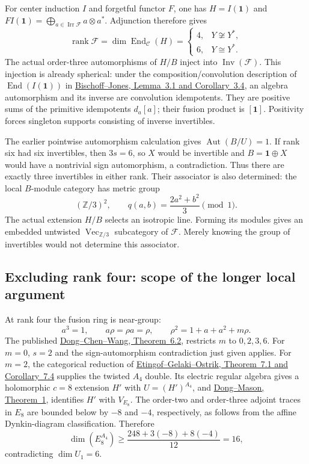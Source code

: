 For center induction $I$ and forgetful functor $F$, one has $H=I(\mathbf1)$
and $FI(\mathbf1)=\bigoplus_{a\in\operatorname{Irr}\mathcal F}a\otimes a^*$.
Adjunction therefore gives
\begin{equation}
 \operatorname{rank}\mathcal F
 =\dim\operatorname{End}_{\mathcal C}(H)
 =\begin{cases}4,&Y\not\cong Y^*,\\6,&Y\cong Y^*.
 \end{cases}
 \label{eq:rank-fork}
\end{equation}
The actual order-three automorphisms of $H/B$ inject into
$\operatorname{Inv}(\mathcal F)$. This injection is already spherical:
under the composition/convolution description of
$\operatorname{End}(I(\mathbf1))$ in
\href{https://arxiv.org/html/1909.02816}{Bischoff--Jones,
Lemma~3.1 and Corollary~3.4}, an algebra automorphism and its inverse
are convolution idempotents. They are positive sums of the primitive
idempotents $d_a[a]$; their fusion product is $[\mathbf1]$. Positivity
forces singleton supports consisting of inverse invertibles.

The earlier pointwise automorphism calculation gives
$\operatorname{Aut}(B/U)=1$. If rank six had six invertibles, then
$3s=6$, so $X$ would be invertible and $B=\mathbf1\oplus X$ would
have a nontrivial sign automorphism, a contradiction. Thus there are
exactly three invertibles in either rank. Their associator is also
determined: the local $B$-module category has metric group
\[
 (\mathbb Z/3)^2,\qquad q(a,b)=\frac{2a^2+b^2}{3}\pmod1.
\]
The actual extension $H/B$ selects an isotropic line. Forming its
modules gives an embedded untwisted $\operatorname{Vec}_{\mathbb Z/3}$
subcategory of $\mathcal F$. Merely knowing the group of invertibles
would not determine this associator.

\subsection{Excluding rank four: scope of the longer local argument}

At rank four the fusion ring is near-group:
\[
 a^3=1,\qquad a\rho=\rho a=\rho,\qquad
 \rho^2=1+a+a^2+m\rho.
\]
The published \href{https://doi.org/10.1016/j.jalgebra.2022.02.020}
{Dong--Chen--Wang, Theorem~6.2}, restricts $m$ to $0,2,3,6$.
For $m=0$, $s=2$ and the sign-automorphism contradiction just given
applies. For $m=2$, the categorical reduction of
\href{https://arxiv.org/html/math/0304194#S7}{Etingof--Gelaki--Ostrik,
Theorem~7.1 and Corollary~7.4} supplies the twisted $A_4$ double.
Its electric regular algebra gives a holomorphic $c=8$ extension
$H'$ with $U=(H')^{A_4}$, and
\href{https://msp.org/pjm/2004/213-2/pjm-v213-n2-p05-p.pdf}
{Dong--Mason, Theorem~1}, identifies $H'$ with $V_{E_8}$.
The order-two and order-three adjoint traces in $E_8$ are bounded
below by $-8$ and $-4$, respectively, as follows from the affine
Dynkin-diagram classification. Therefore
\[
 \dim(E_8^{A_4})\ge\frac{248+3(-8)+8(-4)}{12}=16,
\]
contradicting $\dim U_1=6$.

